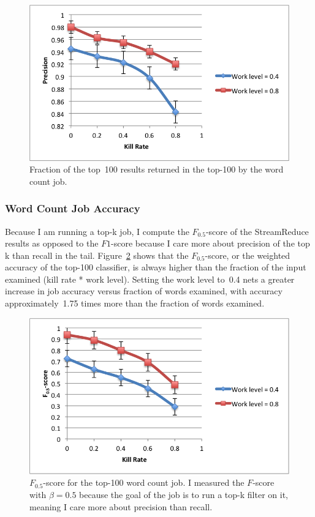 \documentclass[12pt,twocolumn]{article}
\begin{document}
\begin{figure}
\includegraphics[width=\linewidth]{top-100-precision.png}
\caption{Fraction of the top~100 results returned in the top-100 by the word count job.}
\label{fig:precision}
\end{figure}

\subsubsection{Word Count Job Accuracy}
Because I am running a top-k job, I compute the $F_{0.5}$-score of the StreamReduce results as
opposed to the $F1$-score because I care more about precision of the top k than recall
in the tail. Figure~\ref{fig:fscore} shows that the $F_{0.5}$-score, or the weighted
accuracy of the top-100 classifier, is always higher than the fraction of the input
examined (kill rate * work level). Setting the work level to~0.4 nets a greater increase
in job accuracy versus fraction of words examined, with accuracy approximately~1.75 times
more than the fraction of words examined.

\begin{figure}
\includegraphics[width=\linewidth]{f-score.png}
\caption{$F_{0.5}$-score for the top-100 word count job. I measured the $F$-score with $\beta=0.5$ because the goal of the job is to run a top-k filter on it, meaning I care more about precision than recall.}
\label{fig:fscore}
\end{figure}
\end{document}
